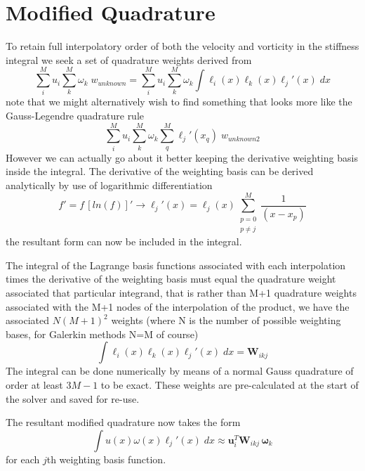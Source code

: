 \documentclass[letterpaper,12pt]{report}
\newcommand{\be}{\begin{equation}}
\newcommand{\ben}[1]{\begin{equation}\label{#1}}
\newcommand{\ee}{\end{equation}}
\begin{document}
\section{Modified Quadrature}\label{ModQuad}
To retain full interpolatory order of both the velocity and vorticity in the stiffness integral we seek a set of quadrature weights derived from
\be \sum_i^M u_i \sum_k^M \omega_k \;w_{unknown} = \sum_i^M u_i \sum_k^M \omega_k \int \ell_i(x) \ell_k(x) \ell_j'(x) \;dx \ee
note that we might alternatively wish to find something that looks more like the Gauss-Legendre quadrature rule
\be \sum_i^M u_i \sum_k^M \omega_k \sum_q^M \ell_j'(x_q) \;w_{unknown2} \ee
However we can actually go about it better keeping the derivative weighting basis inside the integral.
The derivative of the weighting basis can be derived analytically by use of logarithmic differentiation
\be f' = f \, [ln(f)]' \rightarrow \ell_j'(x)=\ell_j(x) \sum_{\substack{p=0\\ p\neq j}}^M \frac{1}{(x-x_p)} \ee
the resultant form can now be included in the integral.

The integral of the Lagrange basis functions associated with each interpolation times the derivative of the weighting basis must equal the quadrature weight associated that particular integrand, that is rather than M+1  quadrature weights associated with the M+1 nodes of the interpolation of the product, we have the associated $N(M+1)^2$ weights (where N is the number of possible weighting bases, for Galerkin methods N=M of course)
\be \int \ell_i(x) \ell_k(x) \ell_j'(x) \;dx = \mathbf{W}_{ikj} \ee
The integral can be done numerically by means of a normal Gauss quadrature of order at least $3M-1$ to be exact. These weights are pre-calculated at the start of the solver and saved for re-use.

The resultant modified quadrature now takes the form
\ben{modQuad} \int u(x) \omega(x) \ell_j'(x) \;dx \approx \mathbf{u}_i^T \mathbf{W}_{ikj} \, \boldsymbol{\omega}_k \ee
for each $j$th weighting basis function.
\end{document}
